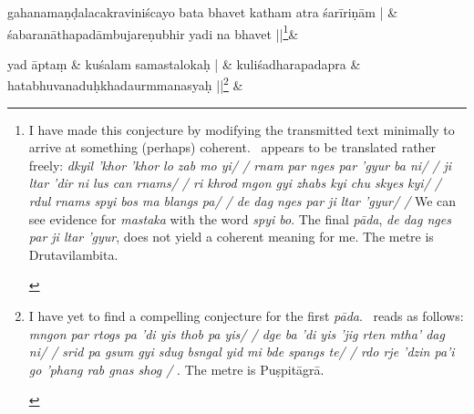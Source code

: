 \documentclass[naipra.tex]{subfiles}
\begin{document}
\begin{sanskrit}
\medskip\versequote
gahanamaṇḍalacakraviniścayo bata bhavet katham atra śarīriṇām | &
śabaranāthapadāmbujareṇubhir yadi na  bhavet ||\footnote{
	\begin{english}%
		I have made this conjecture by modifying the transmitted text minimally to arrive at something (perhaps) coherent.
		\TIB\ appears to be translated rather freely: \emph{%
			dkyil 'khor 'khor lo zab mo yi/ /
			rnam par nges par 'gyur ba ni/ /
			ji ltar 'dir ni lus can rnams/ /
			ri khrod mgon gyi zhabs kyi chu skyes kyi/ /
			rdul rnams spyi bos ma blangs pa/ /
			de dag nges par ji ltar 'gyur/ /%
			} We can see evidence for \emph{mastaka} with the word \emph{spyi bo}.
			The final \emph{pāda}, \emph{de dag nges par ji ltar 'gyur}, does not yield a coherent meaning for me.
			The metre is Drutavilambita.
	\end{english}
}\&

% 
%   


\medskip\versequote
{} yad āptaṃ &
\hspace{20pt} kuśalam  samastalokaḥ | \&
\versequote
kuliśadharapadapra &
\hspace{20pt} hatabhuvanaduḥkhadaurmmanasyaḥ ||\footnote{
	\begin{english}%
		I have yet to find a compelling conjecture for the first \emph{pāda}.
		\TIB\ reads as follows: \emph{%
			mngon par rtogs pa 'di yis thob pa yis/ /
			dge ba 'di yis 'jig rten mtha' dag ni/ /
			srid pa gsum gyi sdug bsngal yid mi bde spangs te/ / 
			rdo rje 'dzin pa'i go 'phang rab gnas shog /
			}. The metre is Puṣpitāgrā.
	\end{english}
} \&




\end{sanskrit}
\end{document}
